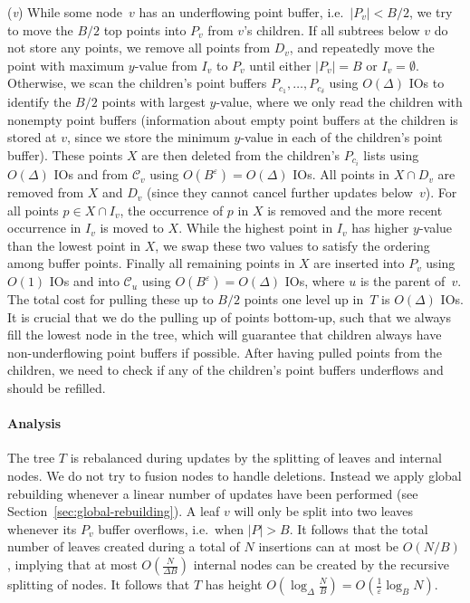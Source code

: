 \documentclass[11pt]{article}
\begin{document}
(\textit{v}) While some node~$v$ has an underflowing point buffer,
i.e.\ $|P_v|<B/2$, we try to move the $B/2$ top points into $P_v$ from
$v$'s children. If all subtrees below $v$ do not store any points, we
remove all points from $D_v$, and repeatedly move the point with
maximum $y$-value from $I_v$ to $P_v$ until either $|P_v|=B$ or
$I_v=\emptyset$.  Otherwise, we scan the children's point buffers
$P_{c_1},\ldots,P_{c_\delta}$ using $O(\Delta)$ IOs to identify the
$B/2$ points with largest $y$-value, where we only read the children
with nonempty point buffers (information about empty point buffers at
the children is stored at $v$, since we store the minimum $y$-value in
each of the children's point buffer). These points $X$ are then
deleted from the children's $P_{c_i}$ lists using $O(\Delta)$ IOs and
from $\mathcal{C}_v$ using $O(B^{\varepsilon})=O(\Delta)$ IOs. All
points in $X\cap D_v$ are removed from $X$ and $D_v$ (since they
cannot cancel further updates below~$v$). For all points $p\in X\cap
I_v$, the occurrence of $p$ in $X$ is removed and the more recent
occurrence in $I_v$ is moved to $X$.  While the highest point in $I_v$
has higher $y$-value than the lowest point in $X$, we swap these two
values to satisfy the ordering among buffer points.  Finally all
remaining points in $X$ are inserted into $P_v$ using $O(1)$ IOs and
into $\mathcal{C}_u$ using $O(B^{\varepsilon})=O(\Delta)$ IOs, where
$u$ is the parent of~$v$. The total cost for pulling these up to $B/2$
points one level up in~$T$ is $O(\Delta)$ IOs. It is crucial that we
do the pulling up of points bottom-up, such that we always fill the
lowest node in the tree, which will guarantee that children always
have non-underflowing point buffers if possible. After having pulled
points from the children, we need to check if any of the children's
point buffers underflows and should be refilled.

\paragraph*{Analysis}

The tree $T$ is rebalanced during updates by the splitting of leaves
and internal nodes. We do not try to fusion nodes to handle
deletions. Instead we apply global rebuilding whenever a linear number
of updates have been performed (see
Section~\ref{sec:global-rebuilding}). A leaf $v$ will only be split
into two leaves whenever its $P_v$ buffer overflows, i.e.\ when
$|P|>B$. It follows that the total number of leaves created during a
total of $N$ insertions can at most be $O(N/B)$, implying that at most
$O(\frac{N}{\Delta B})$ internal nodes can be created by the recursive
splitting of nodes. It follows that $T$ has height
$O(\log_\Delta\frac{N}{B})=O(\frac{1}{\varepsilon}\log_B N)$.
\end{document}
